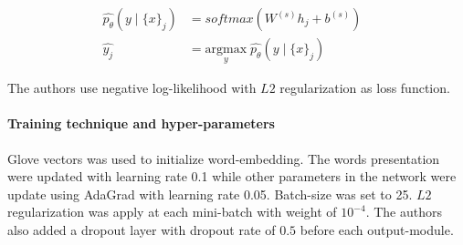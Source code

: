 \begin{align}
  	\hat{p_{\theta}}(y \mid \{x\}_j ) &= softmax( W^{(s)} h_j + b^{(s)}) & \\
  	\hat{y_j} &= \underset{y}{\mathrm{argmax}} \; \hat{p_{\theta}}(y \mid \{x\}_j ) &
\end{align}

The authors use negative log-likelihood with \(L2\) regularization as loss function\cite{treeLSTM}.

\paragraph{Training technique and hyper-parameters}
Glove vectors\cite{glove} was used to initialize word-embedding. 
The words presentation were updated with learning rate 0.1 while other parameters in the network were update using AdaGrad\cite{adagrad} with learning rate 0.05. 
Batch-size was set to 25. 
\(L2\) regularization was apply at each mini-batch with weight of \(10^{-4}\).
The authors also added a dropout layer\cite{dropout} with dropout rate of \(0.5\) before each output-module.


